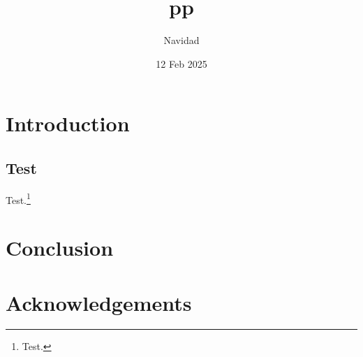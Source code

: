 \documentclass{amsart}
\begin{document}
%
%
\title{pp}
\author{Navidad}
\date{12 Feb 2025}
%
%
\begin{abstract}
\lipsum[1][1-6]
\end{abstract}
\keywords{\lipsum[1][1]}
%
%
\maketitle
%
%
\section{Introduction}
\label{s:intro}
\subsection{Test}
\label{ss:test}
Test.\footnote{Test.}
%
%
\section{Conclusion}
\label{s:concl}
\lipsum[1][1-6]
%
%
\section*{Acknowledgements}
\label{s:acknow}
\lipsum[1][1-3]
%
%
%
%
\end{document}
